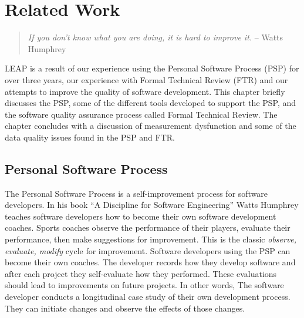 
\chapter{Related Work}
\label{sec:related}

\begin{quote}
{\em If you don't know what you are doing, it is hard to improve it.} -- Watts Humphrey
\end{quote}

LEAP is a result of our experience using the Personal Software Process (PSP)
for over three years, our experience with Formal Technical Review (FTR) and our
attempts to improve the quality of software development.  This chapter briefly
discusses the PSP, some of the different tools developed to support the PSP,
and the software quality assurance process called Formal Technical Review.  The
chapter concludes with a discussion of measurement dysfunction and some of the
data quality issues found in the PSP and FTR.

\section{Personal Software Process}

The Personal Software Process\cite{Humphrey95} is a self-improvement process
for software developers. In his book ``A Discipline for Software Engineering''
Watts Humphrey teaches software developers how to become their own software
development coaches. Sports coaches observe the performance of their players,
evaluate their performance, then make suggestions for improvement.  This is the
classic {\em observe, evaluate, modify} cycle for improvement.  Software
developers using the PSP can become their own coaches.  The developer records
how they develop software and after each project they self-evaluate how they
performed.  These evaluations should lead to improvements on future projects.
In other words, The software developer conducts a longitudinal case study of
their own development process.  They can initiate changes and observe the
effects of those changes.

